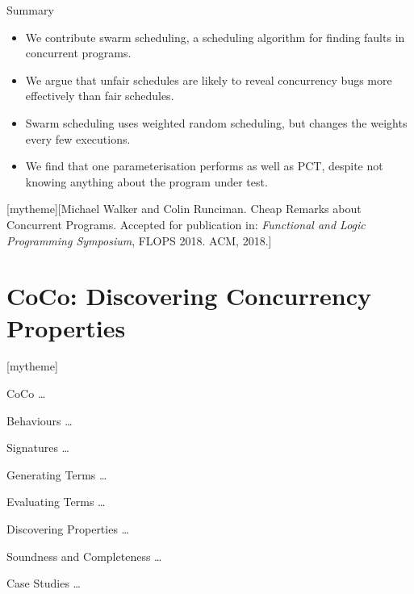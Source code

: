 \documentclass{beamer}
\newcommand{\sectiontext}[2]{
   \setbeamertemplate{section page}[mytheme][#2]
   \section{#1}
   \setbeamertemplate{section page}[mytheme]
}
\begin{document}
\begin{frame}{Summary}
  \begin{itemize}
  \item We contribute swarm scheduling, a scheduling algorithm for
    finding faults in concurrent programs.

  \item We argue that unfair schedules are likely to reveal
    concurrency bugs more effectively than fair schedules.

  \item Swarm scheduling uses weighted random scheduling, but changes
    the weights every few executions.

  \item We find that one parameterisation performs as well as PCT,
    despite not knowing anything about the program under test.
  \end{itemize}
\end{frame}

\sectiontext{CoCo: Discovering Concurrency Properties}{Michael Walker and Colin Runciman.  Cheap Remarks about Concurrent Programs.  Accepted for publication in: \emph{Functional and Logic Programming Symposium}, FLOPS 2018.  ACM, 2018.}

\begin{frame}{CoCo}
  \ldots
\end{frame}

\begin{frame}{Behaviours}
  \ldots
\end{frame}

\begin{frame}{Signatures}
  \ldots
\end{frame}

\begin{frame}{Generating Terms}
  \ldots
\end{frame}

\begin{frame}{Evaluating Terms}
  \ldots
\end{frame}

\begin{frame}{Discovering Properties}
  \ldots
\end{frame}

\begin{frame}{Soundness and Completeness}
  \ldots
\end{frame}

\begin{frame}{Case Studies}
  \ldots
\end{frame}
\end{document}
